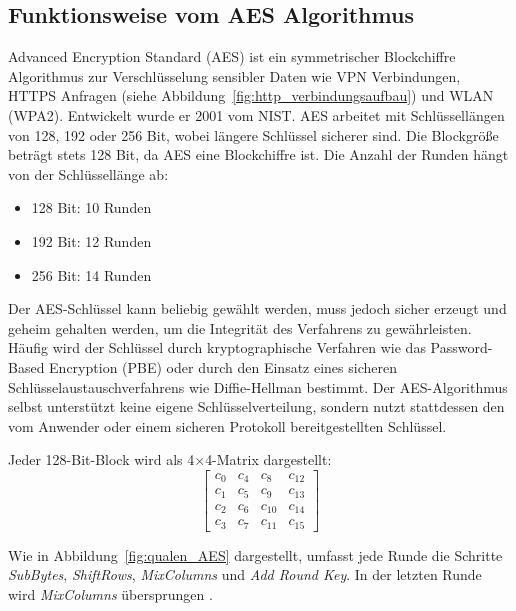 \subsection{Funktionsweise vom AES Algorithmus}
\label{sec:aes}
\setlength{\parindent}{0pt}

Advanced Encryption Standard (AES) ist ein symmetrischer Blockchiffre Algorithmus zur 
Verschlüsselung sensibler Daten wie VPN Verbindungen, HTTPS Anfragen 
(siehe Abbildung~\ref{fig:http_verbindungsaufbau}) und WLAN (WPA2). 
Entwickelt wurde er 2001 vom NIST. AES arbeitet mit Schlüssellängen von 128, 192 oder 256 Bit, 
wobei längere Schlüssel sicherer sind. Die Blockgröße beträgt stets 128 Bit, da AES eine Blockchiffre 
ist. Die Anzahl der Runden hängt von der Schlüssellänge ab: 
\begin{itemize}
    \item 128 Bit: 10 Runden
    \item 192 Bit: 12 Runden
    \item 256 Bit: 14 Runden
\end{itemize}
Der AES-Schlüssel kann beliebig gewählt werden, muss jedoch sicher erzeugt und geheim gehalten werden, um 
die Integrität des Verfahrens zu gewährleisten. Häufig wird der Schlüssel durch kryptographische Verfahren 
wie das Password-Based Encryption (PBE) oder durch den Einsatz eines sicheren Schlüsselaustauschverfahrens 
wie Diffie-Hellman bestimmt. Der AES-Algorithmus selbst unterstützt keine eigene Schlüsselverteilung, sondern 
nutzt stattdessen den vom Anwender oder einem sicheren Protokoll bereitgestellten Schlüssel.


Jeder 128-Bit-Block wird als 4$\times$4-Matrix dargestellt:
\[
\begin{bmatrix}
c_0  & c_4  & c_8  & c_{12} \\
c_1  & c_5  & c_9  & c_{13} \\
c_2  & c_6  & c_{10} & c_{14} \\
c_3  & c_7  & c_{11} & c_{15}
\end{bmatrix}
\]

Wie in Abbildung~\ref{fig:qualen_AES} dargestellt, umfasst jede Runde die Schritte \textit{SubBytes}, \textit{ShiftRows}, \textit{MixColumns} und \textit{Add Round Key}. 
In der letzten Runde wird \textit{MixColumns} über\-sprungen \cite{AES_Algorithmus_2} \cite{AES_Algorithmus_3} \cite{AES_Algorithmus} \cite{Blockchiffre}.

